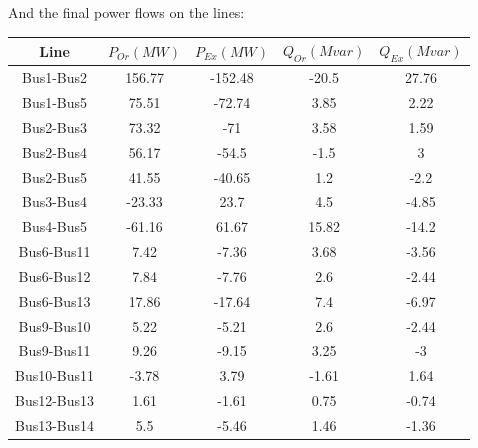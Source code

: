 \documentclass[a4paper, 12pt]{report}
\begin{document}
And the final power flows on the lines:

\begin{center}
\begin{tabular}{|c|c|c|c|c|}
  \hline
  Line & $P_{Or} (MW)$ & $P_{Ex} (MW)$ & $Q_{Or} (Mvar)$ & $Q_{Ex} (Mvar)$ \\
  \hline
  Bus1-Bus2 & 156.77 & -152.48 & -20.5 & 27.76 \\
  Bus1-Bus5 & 75.51 & -72.74 & 3.85 & 2.22 \\
  Bus2-Bus3 & 73.32 & -71 & 3.58 & 1.59 \\
  Bus2-Bus4 & 56.17 & -54.5 & -1.5 & 3 \\
  Bus2-Bus5 & 41.55 & -40.65 & 1.2 & -2.2 \\
  Bus3-Bus4 & -23.33 & 23.7 & 4.5 & -4.85 \\
  Bus4-Bus5 & -61.16 & 61.67 & 15.82 & -14.2 \\
  Bus6-Bus11 & 7.42 & -7.36 & 3.68 & -3.56 \\
  Bus6-Bus12 & 7.84 & -7.76 & 2.6 & -2.44 \\
  Bus6-Bus13 & 17.86 & -17.64 & 7.4 & -6.97 \\
  Bus9-Bus10 & 5.22 & -5.21 & 2.6 & -2.44 \\
  Bus9-Bus11 & 9.26 & -9.15 & 3.25 & -3 \\
  Bus10-Bus11 & -3.78 & 3.79 & -1.61 & 1.64 \\
  Bus12-Bus13 & 1.61 & -1.61 & 0.75 & -0.74 \\
  Bus13-Bus14 & 5.5 & -5.46 & 1.46 & -1.36 \\
  \hline
\end{tabular}
\end{center}
\end{document}
